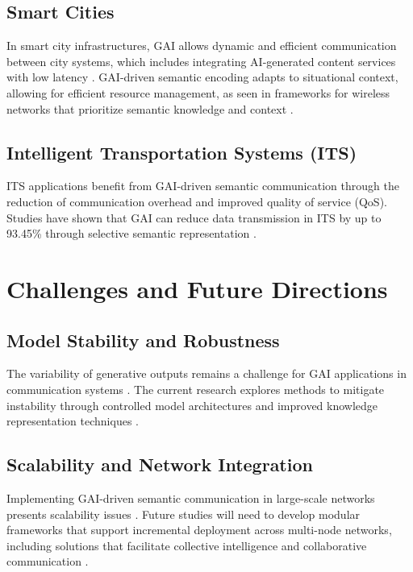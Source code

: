\documentclass[journal]{IEEEtran}
\begin{document}
\subsection{Smart Cities}
In smart city infrastructures, GAI allows dynamic and efficient communication between city systems, which includes integrating AI-generated content services with low latency \cite{10614204}. GAI-driven semantic encoding adapts to situational context, allowing for efficient resource management, as seen in frameworks for wireless networks that prioritize semantic knowledge and context \cite{bariah2023largegenerativeaimodels}.

\subsection{Intelligent Transportation Systems (ITS)}
ITS applications benefit from GAI-driven semantic communication through the reduction of communication overhead and improved quality of service (QoS). Studies have shown that GAI can reduce data transmission in ITS by up to 93.45\% through selective semantic representation \cite{10634888,raha2023generativeaidrivensemanticcommunication}.

\section{Challenges and Future Directions}

\subsection{Model Stability and Robustness}
The variability of generative outputs remains a challenge for GAI applications in communication systems \cite{10447237}. The current research explores methods to mitigate instability through controlled model architectures and improved knowledge representation techniques \cite{Thomas2023CausalRC}.

\subsection{Scalability and Network Integration}
Implementing GAI-driven semantic communication in large-scale networks presents scalability issues \cite{jiang2024largeaimodelbasedsemantic}. Future studies will need to develop modular frameworks that support incremental deployment across multi-node networks, including solutions that facilitate collective intelligence and collaborative communication \cite{10634888}.
\end{document}
